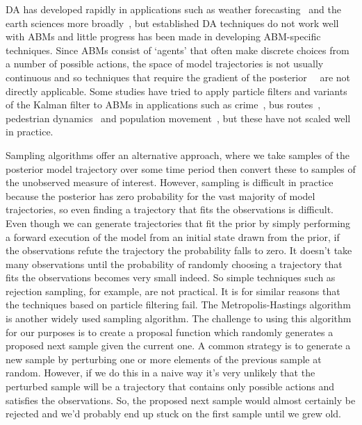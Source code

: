 \documentclass{article}
\begin{document}
DA has developed rapidly in applications such as weather forecasting~\cite{kalnay_atmospheric_2003} and the earth sciences more broadly~\cite{reichle_data_2008}, but established DA techniques do not work well with ABMs and little progress has been made in developing ABM-specific techniques. Since ABMs consist of `agents' that often make discrete choices from a number of possible actions, the space of model trajectories is not usually continuous and so techniques that require the gradient of the posterior~\cite{talagrand_assimilation_1997}~\cite{lewis_dynamic_2006} are not directly applicable. Some studies have tried to apply particle filters and variants of the Kalman filter to ABMs in applications such as crime~\cite{lloyd_exploring_2016}, bus routes~\cite{kieu_dealing_2020}, pedestrian dynamics~\cite{wang_data_2015, ward_dynamic_2016, clay_realtime_2020, malleson_simulating_2020} and population movement~\cite{lueck_who_2019}, but these have not scaled well in practice.

Sampling algorithms offer an alternative approach, where we take samples of the posterior model trajectory over some time period then convert these to samples of the unobserved measure of interest. However, sampling is difficult in practice because the posterior has zero probability for the vast majority of model trajectories, so even finding a trajectory that fits the observations is difficult. Even though we can generate trajectories that fit the prior by simply performing a forward execution of the model from an initial state drawn from the prior, if the observations refute the trajectory the probability falls to zero. It doesn't take many observations until the probability of randomly choosing a trajectory that fits the observations becomes very small indeed. So simple techniques such as rejection sampling, for example, are not practical.  It is for similar reasons that the techniques based on particle filtering fail. The Metropolis-Hastings algorithm is another widely used sampling algorithm. The challenge to using this algorithm for our purposes is to create a proposal function which randomly generates a proposed next sample given the current one. A common strategy is to generate a new sample by perturbing one or more elements of the previous sample at random. However, if we do this in a naive way it's very unlikely that the perturbed sample will be a trajectory that contains only possible actions and satisfies the observations. So, the proposed next sample would almost certainly be rejected and we'd probably end up stuck on the first sample until we grew old. 
\end{document}
